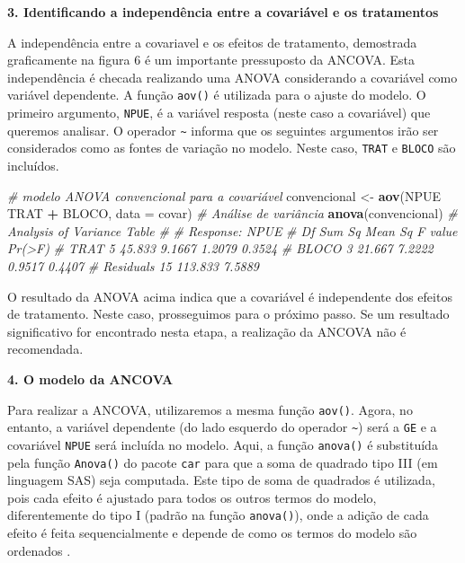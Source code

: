\documentclass[
]{book}
\newenvironment{Shaded}{\begin{snugshade}}{\end{snugshade}}
\newcommand{\CommentTok}[1]{\textcolor[rgb]{0.56,0.35,0.01}{\textit{#1}}}
\newcommand{\DataTypeTok}[1]{\textcolor[rgb]{0.13,0.29,0.53}{#1}}
\newcommand{\KeywordTok}[1]{\textcolor[rgb]{0.13,0.29,0.53}{\textbf{#1}}}
\newcommand{\NormalTok}[1]{#1}
\newcommand{\OperatorTok}[1]{\textcolor[rgb]{0.81,0.36,0.00}{\textbf{#1}}}
\newcommand{\StringTok}[1]{\textcolor[rgb]{0.31,0.60,0.02}{#1}}
\begin{document}
\textbf{3. Identificando a independência entre a covariável e os tratamentos}

A independência entre a covariavel e os efeitos de tratamento, demostrada graficamente na figura 6 é um importante pressuposto da ANCOVA. Esta independência é checada realizando uma ANOVA considerando a covariável como variável dependente. A função \texttt{aov()} é utilizada para o ajuste do modelo. O primeiro argumento, \texttt{NPUE}, é a variável resposta (neste caso a covariável) que queremos analisar. O operador \texttt{\textasciitilde{}} informa que os seguintes argumentos irão ser considerados como as fontes de variação no modelo. Neste caso, \texttt{TRAT} e \texttt{BLOCO} são incluídos.

\begin{Shaded}
\begin{Highlighting}[]
\CommentTok{# modelo ANOVA convencional para a covariável}
\NormalTok{convencional <-}\StringTok{ }\KeywordTok{aov}\NormalTok{(NPUE }\OperatorTok{~}\StringTok{  }\NormalTok{TRAT }\OperatorTok{+}\StringTok{ }\NormalTok{BLOCO, }\DataTypeTok{data =}\NormalTok{ covar)}
\CommentTok{# Análise de variância}
\KeywordTok{anova}\NormalTok{(convencional) }
\CommentTok{# Analysis of Variance Table}
\CommentTok{# }
\CommentTok{# Response: NPUE}
\CommentTok{#           Df  Sum Sq Mean Sq F value Pr(>F)}
\CommentTok{# TRAT       5  45.833  9.1667  1.2079 0.3524}
\CommentTok{# BLOCO      3  21.667  7.2222  0.9517 0.4407}
\CommentTok{# Residuals 15 113.833  7.5889}
\end{Highlighting}
\end{Shaded}


O resultado da ANOVA acima indica que a covariável é independente dos efeitos de tratamento. Neste caso, prosseguimos para o próximo passo. Se um resultado significativo for encontrado nesta etapa, a realização da ANCOVA não é recomendada.

\textbf{4. O modelo da ANCOVA}

Para realizar a ANCOVA, utilizaremos a mesma função \texttt{aov()}. Agora, no entanto, a variável dependente (do lado esquerdo do operador \texttt{\textasciitilde{}}) será a \texttt{GE} e a covariável \texttt{NPUE} será incluída no modelo. Aqui, a função \texttt{anova()} é substituída pela função \texttt{Anova()} do pacote \texttt{car} para que a soma de quadrado tipo III (em linguagem SAS) seja computada. Este tipo de soma de quadrados é utilizada, pois cada efeito é ajustado para todos os outros termos do modelo, diferentemente do tipo I (padrão na função \texttt{anova()}), onde a adição de cada efeito é feita sequencialmente e depende de como os termos do modelo são ordenados \citep{Langsrud2003}.
\end{document}
